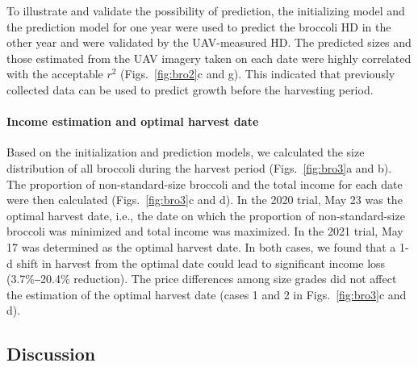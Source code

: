 

To illustrate and validate the possibility of prediction, the initializing model and the prediction model for one year were used to predict the broccoli HD in the other year and were validated by the UAV-measured HD. The predicted sizes and those estimated from the UAV imagery taken on each date were highly correlated with the acceptable $r^2$ (Figs.~\ref{fig:bro2}c and g). This indicated that previously collected data can be used to predict growth before the harvesting period.

\paragraph{Income estimation and optimal harvest date}

Based on the initialization and prediction models, we calculated the size distribution of all broccoli during the harvest period (Figs.~\ref{fig:bro3}a and b). The proportion of non-standard-size broccoli and the total income for each date were then calculated (Figs.~\ref{fig:bro3}c and d). In the 2020 trial, May 23 was the optimal harvest date, i.e., the date on which the proportion of non-standard-size broccoli was minimized and total income was maximized. In the 2021 trial, May 17 was determined as the optimal harvest date. In both cases, we found that a 1-d shift in harvest from the optimal date could lead to significant income loss (3.7\%‒20.4\% reduction). The price differences among size grades did not affect the estimation of the optimal harvest date (cases 1 and 2 in Figs.~\ref{fig:bro3}c and d).




\subsection{Discussion}

